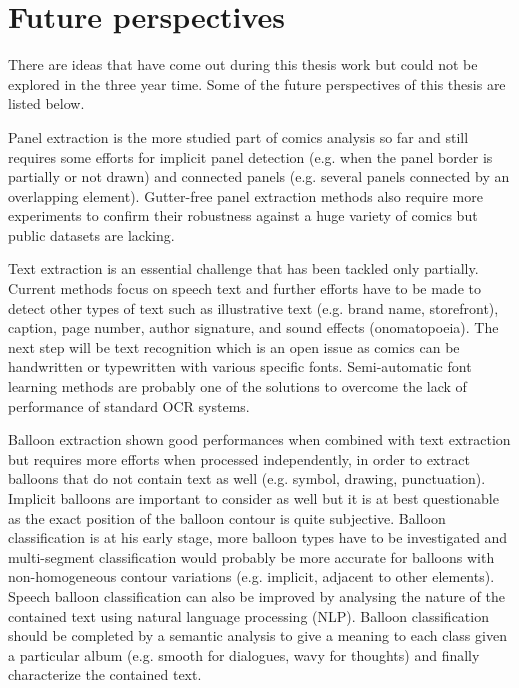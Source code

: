 \section{Future perspectives}
\label{conclusions:perspectives}

There are ideas that have come out during this thesis work but could not be explored in the three year time.
Some of the future perspectives of this thesis are listed below.

Panel extraction is the more studied part of comics analysis so far and still requires some efforts for implicit panel detection (e.g. when the panel border is partially or not drawn) and connected panels (e.g. several panels connected by an overlapping element).
Gutter-free panel extraction methods also require more experiments to confirm their robustness against a huge variety of comics but public datasets are lacking.

Text extraction is an essential challenge that has been tackled only partially.
Current methods focus on speech text and further efforts have to be made to detect other types of text such as illustrative text (e.g. brand name, storefront), caption, page number, author signature, and sound effects (onomatopoeia).
The next step will be text recognition which is an open issue as comics can be handwritten or typewritten with various specific fonts.
Semi-automatic font learning methods are probably one of the solutions to overcome the lack of performance of standard OCR systems. 

Balloon extraction shown good performances when combined with text extraction but requires more efforts when processed independently, in order to extract balloons that do not contain text as well (e.g. symbol, drawing, punctuation).
Implicit balloons are important to consider as well but it is at best questionable as the exact position of the balloon contour is quite subjective.
Balloon classification is at his early stage, more balloon types have to be investigated and multi-segment classification would probably be more accurate for balloons with non-homogeneous contour variations (e.g. implicit, adjacent to other elements). 
Speech balloon classification can also be improved by analysing the nature of the contained text using natural language processing (NLP).
Balloon classification should be completed by a semantic analysis to give a meaning to each class given a particular album (e.g. smooth for dialogues, wavy for thoughts) and finally characterize the contained text.

